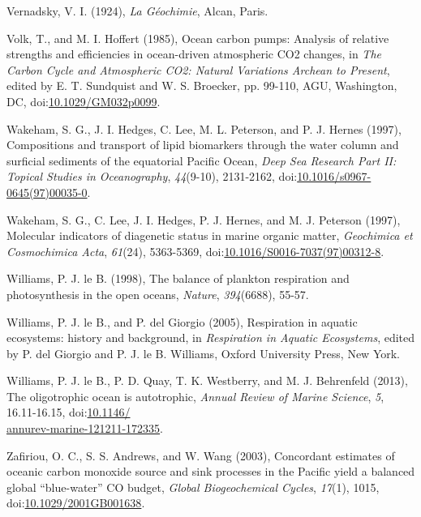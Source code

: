 \begin{singlespace}
{{Vernadsky, V. I. (1924), \emph{La G\'{e}ochimie}, Alcan, Paris.

Volk, T., and M. I. Hoffert (1985), Ocean carbon pumps: Analysis of relative strengths and efficiencies in ocean-driven atmospheric CO2 changes, in \emph{The Carbon Cycle and Atmospheric CO2: Natural Variations Archean to Present}, edited by E. T. Sundquist and W. S. Broecker, pp. 99-110, AGU, Washington, DC, doi:\href{http://dx.doi.org/10.1029/GM032p0099}{10.1029/GM032p0099}.

Wakeham, S. G., J. I. Hedges, C. Lee, M. L. Peterson, and P. J. Hernes
(1997), Compositions and transport of lipid biomarkers through the water
column and surficial sediments of the equatorial Pacific Ocean,
\emph{Deep Sea Research Part II: Topical Studies in Oceanography}, \emph{44}(9-10), 2131-2162,
doi:\href{http://dx.doi.org/10.1016/s0967-0645(97)00035-0}{10.1016/s0967-0645(97)00035-0}.

Wakeham, S. G., C. Lee, J. I. Hedges, P. J. Hernes, and M. J. Peterson
(1997), Molecular indicators of diagenetic status in marine organic
matter, \emph{Geochimica et Cosmochimica Acta}, \emph{61}(24), 5363-5369,
doi:\href{http://dx.doi.org/10.1016/S0016-7037(97)00312-8}{10.1016/S0016-7037(97)00312-8}.

Williams, P. J. le B. (1998), The balance of plankton respiration and
photosynthesis in the open oceans, \emph{Nature}, \emph{394}(6688),
55-57.

Williams, P. J. le B., and P. del Giorgio (2005), Respiration in aquatic
ecosystems: history and background, in \emph{Respiration in Aquatic
Ecosystems}, edited by P. del Giorgio and P. J. le B. Williams, Oxford
University Press, New York.

Williams, P. J. le B., P. D. Quay, T. K. Westberry, and M. J. Behrenfeld
(2013), The oligotrophic ocean is autotrophic, \emph{Annual Review of Marine Science}, \emph{5}, 16.11-16.15, doi:\href{http://dx.doi.org/10.1146/annurev-marine-121211-172335}{10.1146/\\annurev-marine-121211-172335}.

Zafiriou, O. C., S. S. Andrews, and W. Wang (2003), Concordant estimates
of oceanic carbon monoxide source and sink processes in the Pacific
yield a balanced global ``blue-water'' CO budget, \emph{Global
Biogeochemical Cycles}, \emph{17}(1), 1015, doi:\href{http://dx.doi.org/10.1029/2001GB001638}{10.1029/2001GB001638}.}}
\end{singlespace}